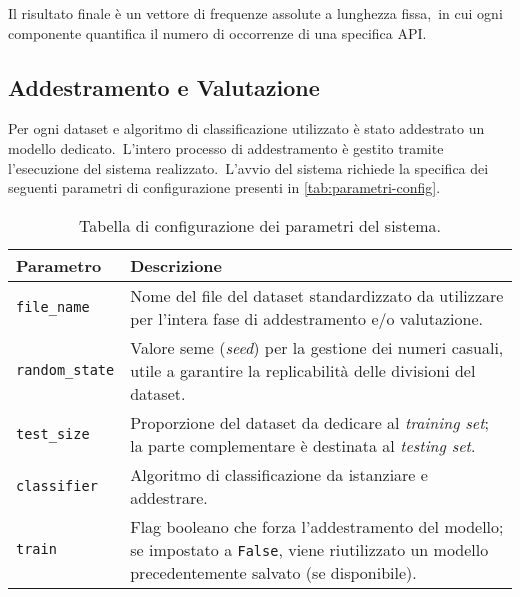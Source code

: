 Il risultato finale è un vettore di frequenze assolute a lunghezza fissa,\
in cui ogni componente quantifica il numero di occorrenze di una specifica API.

\subsection{Addestramento e Valutazione}

Per ogni dataset e algoritmo di classificazione utilizzato è stato addestrato un modello dedicato.\
L'intero processo di addestramento è gestito tramite l'esecuzione del sistema realizzato.\
L'avvio del sistema richiede la specifica dei seguenti parametri di configurazione presenti in \autoref{tab:parametri-config}.

\begin{table}[h!]
    \centering
    \begin{tabular}{lp{10cm}}
        \hline
        \textbf{Parametro}     & \textbf{Descrizione}                                                                                                                                        \\
        \hline
        \texttt{file\_name}    & Nome del file del dataset standardizzato da utilizzare per l’intera fase di addestramento e/o valutazione.                                                  \\[0.5em]
        \texttt{random\_state} & Valore seme (\textit{seed}) per la gestione dei numeri casuali, utile a garantire la replicabilità delle divisioni del dataset.                             \\[0.5em]
        \texttt{test\_size}    & Proporzione del dataset da dedicare al \textit{training set}; la parte complementare è destinata al \textit{testing set}.                                   \\[0.5em]
        \texttt{classifier}    & Algoritmo di classificazione da istanziare e addestrare.                                                                                                    \\[0.5em]
        \texttt{train}         & Flag booleano che forza l’addestramento del modello; se impostato a \texttt{False}, viene riutilizzato un modello precedentemente salvato (se disponibile). \\
        \hline
    \end{tabular}
    \caption{Tabella di configurazione dei parametri del sistema.}
    \label{tab:parametri-config}
\end{table}

